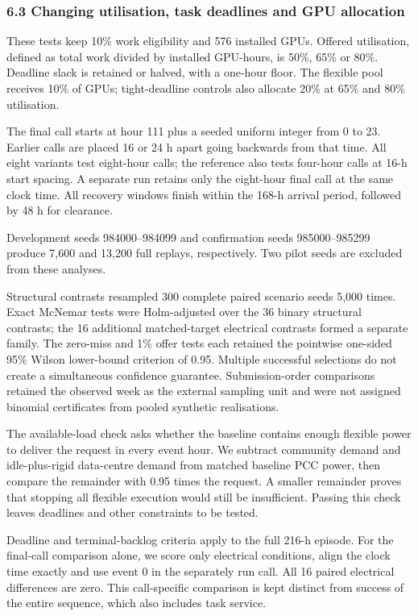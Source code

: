 \documentclass[10pt,a4paper]{article}
\begin{document}
\subsubsection{6.3 Changing utilisation, task deadlines and GPU allocation}

These tests keep 10\% work eligibility and 576 installed GPUs. Offered utilisation, defined as total work divided by installed GPU-hours, is 50\%, 65\% or 80\%. Deadline slack is retained or halved, with a one-hour floor. The flexible pool receives 10\% of GPUs; tight-deadline controls also allocate 20\% at 65\% and 80\% utilisation.


The final call starts at hour 111 plus a seeded uniform integer from 0 to 23. Earlier calls are placed 16 or 24 h apart going backwards from that time. All eight variants test eight-hour calls; the reference also tests four-hour calls at 16-h start spacing. A separate run retains only the eight-hour final call at the same clock time. All recovery windows finish within the 168-h arrival period, followed by 48 h for clearance.


Development seeds 984000–984099 and confirmation seeds 985000–985299 produce 7,600 and 13,200 full replays, respectively. Two pilot seeds are excluded from these analyses.


Structural contrasts resampled 300 complete paired scenario seeds 5,000 times. Exact McNemar tests were Holm-adjusted over the 36 binary structural contrasts; the 16 additional matched-target electrical contrasts formed a separate family. The zero-miss and 1\% offer tests each retained the pointwise one-sided 95\% Wilson lower-bound criterion of 0.95. Multiple successful selections do not create a simultaneous confidence guarantee. Submission-order comparisons retained the observed week as the external sampling unit and were not assigned binomial certificates from pooled synthetic realisations.


The available-load check asks whether the baseline contains enough flexible power to deliver the request in every event hour. We subtract community demand and idle-plus-rigid data-centre demand from matched baseline PCC power, then compare the remainder with 0.95 times the request. A smaller remainder proves that stopping all flexible execution would still be insufficient. Passing this check leaves deadlines and other constraints to be tested.


Deadline and terminal-backlog criteria apply to the full 216-h episode. For the final-call comparison alone, we score only electrical conditions, align the clock time exactly and use event 0 in the separately run call. All 16 paired electrical differences are zero. This call-specific comparison is kept distinct from success of the entire sequence, which also includes task service.
\end{document}
